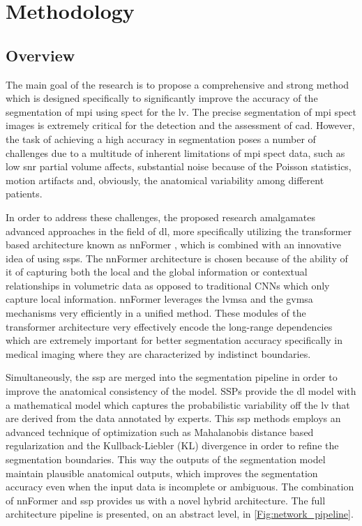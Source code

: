 \chapter{Methodology}
\label{ch:method}

\section{Overview}
The main goal of the research is to propose a comprehensive and strong method which is designed specifically to significantly improve the accuracy of the segmentation of \gls{mpi} using \gls{spect} for the \gls{lv}. The precise segmentation of \gls{mpi} \gls{spect} images is extremely critical for the detection and the assessment of \gls{cad}. However, the task of achieving a high accuracy in segmentation poses a number of challenges due to a multitude of inherent limitations of \gls{mpi} \gls{spect} data, such as low \gls{snr} partial volume affects, substantial noise because of the Poisson statistics, motion artifacts and, obviously, the anatomical variability among different patients. 

In order to address these challenges, the proposed research amalgamates advanced approaches in the field of \gls{dl}, more specifically utilizing the transformer based architecture known as nnFormer \cite{10.1109/TIP.2023.3293771}, which is combined with an innovative idea of using \gls{ssp}s. The nnFormer architecture is chosen because of the ability of it of capturing both the local and the global information or contextual relationships in volumetric data as opposed to traditional CNNs which only capture local information. nnFormer leverages the \gls{lvmsa} and the \gls{gvmsa} mechanisms very efficiently in a unified method. These modules of the transformer architecture very effectively encode the long-range dependencies which are extremely important for better segmentation accuracy specifically in medical imaging where they are characterized by indistinct boundaries.

Simultaneously, the \gls{ssp} are merged into the segmentation pipeline in order to improve the anatomical consistency of the model. SSPs provide the \gls{dl} model with a mathematical model which captures the probabilistic variability off the \gls{lv} that are derived from the data annotated by experts. This \gls{ssp} methods employs an advanced technique of optimization such as Mahalanobis distance based regularization and the Kullback-Liebler (KL) divergence in order to refine the segmentation boundaries. This way the outputs of the segmentation model maintain plausible anatomical outputs, which improves the segmentation accuracy even when the input data is incomplete or ambiguous. The combination of nnFormer and \gls{ssp} provides us with a novel hybrid architecture. The full architecture pipeline is presented, on an abstract level, in \cref{Fig:network_pipeline}.


